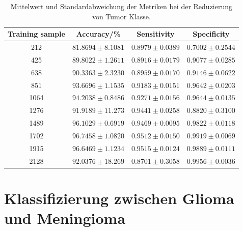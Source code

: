 \begin{table}[H]
    \centering
     {\small
        \begin{tabular}{cccc}
            \toprule
            Training sample & Accuracy/\% & Sensitivity & Specificity\\
            \midrule
            212  & $81.8694 \pm 8.1081$ & $0.8979 \pm 0.0389$ & $0.7002 \pm 0.2544$\\
            425  & $89.8022 \pm 1.2611$ & $0.8916 \pm 0.0179$ & $0.9077 \pm 0.0285$\\
            638  & $90.3363 \pm 2.3230$ & $0.8959 \pm 0.0170$ & $0.9146 \pm 0.0622$\\
            851  & $93.6696 \pm 1.1535$ & $0.9183 \pm 0.0151$ & $0.9642 \pm 0.0203$\\
            1064 & $94.2038 \pm 0.8486$ & $0.9271 \pm 0.0156$ & $0.9644 \pm 0.0135$\\
            1276 & $91.9189 \pm 11.273$ & $0.9441 \pm 0.0258$ & $0.8820 \pm 0.3100$\\
            1489 & $96.1029 \pm 0.6919$ & $0.9469 \pm 0.0095$ & $0.9822 \pm 0.0118$\\
            1702 & $96.7458 \pm 1.0820$ & $0.9512 \pm 0.0150$ & $0.9919 \pm 0.0069$\\
            1915 & $96.6469 \pm 1.1234$ & $0.9515 \pm 0.0124$ & $0.9889 \pm 0.0111$\\
            2128 & $92.0376 \pm 18.269$ & $0.8701 \pm 0.3058$ & $0.9956 \pm 0.0036$\\
            \bottomrule
        \end{tabular}}
  \caption{Mittelwert und Standardabweichung der Metriken bei der Reduzierung von Tumor Klasse.}
  \label{tab:red_tu}
\end{table}
\section{Klassifizierung zwischen Glioma und Meningioma}
